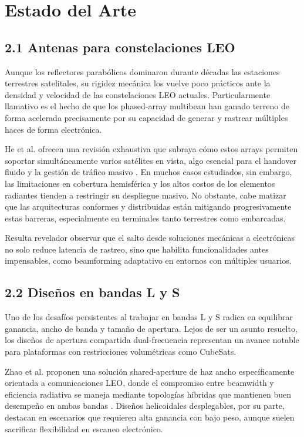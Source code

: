 \section{Estado del Arte}

\subsection{2.1 Antenas para constelaciones LEO}

Aunque los reflectores parabólicos dominaron durante décadas las estaciones terrestres satelitales, su rigidez mecánica los vuelve poco prácticos ante la densidad y velocidad de las constelaciones LEO actuales. Particularmente llamativo es el hecho de que los phased-array multibean han ganado terreno de forma acelerada precisamente por su capacidad de generar y rastrear múltiples haces de forma electrónica. 

He et al. ofrecen una revisión exhaustiva que subraya cómo estos arrays permiten soportar simultáneamente varios satélites en vista, algo esencial para el handover fluido y la gestión de tráfico masivo \cite{He2021}. En muchos casos estudiados, sin embargo, las limitaciones en cobertura hemisférica y los altos costos de los elementos radiantes tienden a restringir su despliegue masivo. No obstante, cabe matizar que las arquitecturas conformes y distribuidas están mitigando progresivamente estas barreras, especialmente en terminales tanto terrestres como embarcadas.

Resulta revelador observar que el salto desde soluciones mecánicas a electrónicas no solo reduce latencia de rastreo, sino que habilita funcionalidades antes impensables, como beamforming adaptativo en entornos con múltiples usuarios.

\subsection{2.2 Diseños en bandas L y S}

Uno de los desafíos persistentes al trabajar en bandas L y S radica en equilibrar ganancia, ancho de banda y tamaño de apertura. Lejos de ser un asunto resuelto, los diseños de apertura compartida dual-frecuencia representan un avance notable para plataformas con restricciones volumétricas como CubeSats. 

Zhao et al. proponen una solución shared-aperture de haz ancho específicamente orientada a comunicaciones LEO, donde el compromiso entre beamwidth y eficiencia radiativa se maneja mediante topologías híbridas que mantienen buen desempeño en ambas bandas \cite{Zhao2024}. Diseños helicoidales desplegables, por su parte, destacan en escenarios que requieren alta ganancia con bajo peso, aunque suelen sacrificar flexibilidad en escaneo electrónico. 

